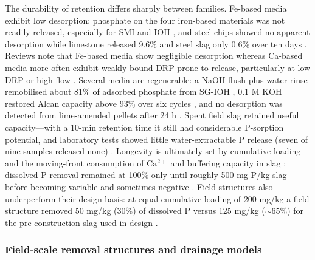 The durability of retention differs sharply between families. Fe-based media exhibit low desorption: phosphate on the four iron-based materials was not readily released, especially for SMI and IOH \parencite{Allred2014}, and steel chips showed no apparent desorption while limestone released 9.6\% and steel slag only 0.6\% over ten days \parencite{Sellner2019b}. Reviews note that Fe-based media show negligible desorption whereas Ca-based media more often exhibit weakly bound DRP prone to release, particularly at low DRP or high flow \parencite{Mendes2022}. Several media are regenerable: a NaOH flush plus water rinse remobilised about 81\% of adsorbed phosphate from SG-IOH \parencite{Allred2017}, 0.1 M KOH restored Alcan capacity above 93\% over six cycles \parencite{Kumari2025}, and no desorption was detected from lime-amended pellets after 24 h \parencite{Li2017}. Spent field slag retained useful capacity---with a 10-min retention time it still had considerable P-sorption potential, and laboratory tests showed little water-extractable P release (seven of nine samples released none) \parencite{Shedekar2020}. Longevity is ultimately set by cumulative loading and the moving-front consumption of $\mathrm{Ca^{2+}}$ and buffering capacity in slag \parencite{Wang2020d}: dissolved-P removal remained at 100\% only until roughly 500 mg P/kg slag before becoming variable and sometimes negative \parencite{Penn2020}. Field structures also underperform their design basis: at equal cumulative loading of 200 mg/kg a field structure removed 50 mg/kg (30\%) of dissolved P versus 125 mg/kg ($\sim$65\%) for the pre-construction slag used in design \parencite{Shedekar2020}.

\subsubsection{Field-scale removal structures and drainage models}

